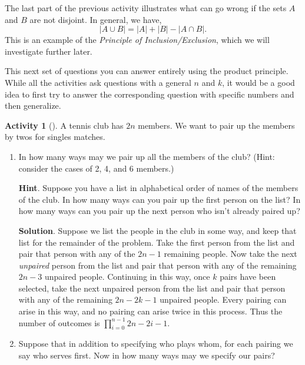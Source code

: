 \documentclass[10pt,]{book}
\theoremstyle{plain}
\theoremstyle{definition}
\theoremstyle{definition}
\theoremstyle{definition}
\newtheorem{activity}[project]{Activity}
\theoremstyle{definition}
\numberwithin{equation}{chapter}
\newcommand{\card}[1]{\left| #1 \right|}
\begin{document}
\hypertarget{p-538}{}%
The last part of the previous activity illustrates what can go wrong if the sets \(A\) and \(B\) are not disjoint.  In general, we have,%
\begin{equation*}
\card{A \cup B} = \card{A} + \card{B} - \card{A \cap B}.
\end{equation*}
This is an example of the \emph{Principle of Inclusion/Exclusion}, which we will investigate further later.%
\par
\hypertarget{p-539}{}%
This next set of questions you can answer entirely using the product principle.  While all the activities ask questions with a general \(n\) and \(k\), it would be a good idea to first try to answer the corresponding question with specific numbers and then generalize.%
\begin{activity}[]\label{tennispairings1}
\hypertarget{p-540}{}%
A tennis club has \(2n\) members. We want to pair up the members by twos for singles matches.%
\begin{enumerate}[font=\bfseries,label=(\alph*),ref=\alph*]
\item\label{task-62} \hypertarget{p-541}{}%
In how many ways may we pair up all the members of the club? (Hint: consider the cases of 2, 4, and 6 members.)%
\par\smallskip%
\noindent\textbf{Hint}.\hypertarget{hint-17}{}\quad%
\hypertarget{p-542}{}%
Suppose you have a list in alphabetical order of names of the members of the club. In how many ways can you pair up the first person on the list? In how many ways can you pair up the next person who isn't already paired up?%
\par\smallskip%
\noindent\textbf{Solution}.\hypertarget{solution-40}{}\quad%
\hypertarget{p-543}{}%
Suppose we list the people in the club in some way, and keep that list for the remainder of the problem. Take the first person from the list and pair that person with any of the \(2n-1\) remaining people. Now take the next \emph{unpaired} person from the list and pair that person with any of the remaining \(2n-3\) unpaired people. Continuing in this way, once \(k\) pairs have been selected, take the next unpaired person from the list and pair that person with any of the remaining \(2n-2k-1\) unpaired people. Every pairing can arise in this way, and no pairing can arise twice in this process. Thus the number of outcomes is \(\prod_{i=0}^{n-1} 2n-2i-1\).%
\item\label{task-63} \hypertarget{p-544}{}%
Suppose that in addition to specifying who plays whom, for each pairing we say who serves first.  Now in how many ways may we specify our pairs?%
\end{enumerate}
\end{activity}
\end{document}
